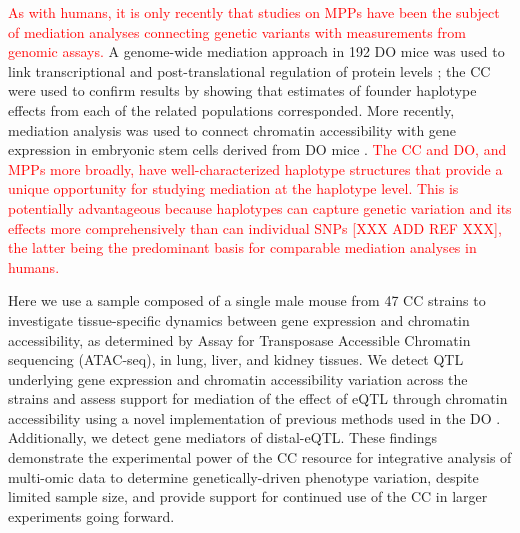 \documentclass[10pt,letterpaper]{article}
\newcommand{\WVinline}[1]{\textcolor{red}{#1}}
\newcommand{\GK}[2]{\textcolor{teal}{#1\footnote{\textcolor{teal}{GK: #2}}}}
\newcommand{\GKinline}[1]{\textcolor{teal}{#1}}
\newcommand{\TF}[2]{\textcolor{purple}{#1\footnote{\textcolor{purple}{TF: #2}}}}
\begin{document}
\WVinline{As with humans, it is only recently that studies on MPPs have been the subject of mediation analyses connecting genetic variants with measurements from genomic assays.}
A genome-wide mediation approach in 192 DO mice was used to link transcriptional and post-translational regulation of protein levels \cite{Chick2016}; the CC were used to confirm results by showing that estimates of founder haplotype effects from each of the related populations corresponded. More recently, mediation analysis was used to connect chromatin accessibility with gene expression in embryonic stem cells derived from DO mice \cite{Skelly2019}. 
\WVinline{The CC and DO, and MPPs more broadly, have well-characterized haplotype structures that provide a unique opportunity for studying mediation at the haplotype level. This is potentially advantageous because haplotypes can capture genetic variation and its effects more comprehensively than can individual SNPs \cite{Zhang2014}[XXX ADD REF XXX], the latter being the predominant basis for comparable mediation analyses in humans.}

Here we use a sample composed of a single male mouse from 47 CC strains to investigate tissue-specific dynamics between gene expression and chromatin accessibility, as determined by Assay for Transposase Accessible Chromatin sequencing (ATAC-seq), in lung, liver, and kidney tissues. We detect QTL underlying gene expression and chromatin accessibility variation across the strains and assess support for mediation of the effect of eQTL through chromatin accessibility using a novel implementation of previous methods used in the DO \cite{Chick2016}. Additionally, we detect gene mediators of distal-eQTL. 
These findings demonstrate the experimental power of the CC resource for integrative analysis of multi-omic data to determine genetically-driven phenotype variation, despite limited sample size, and provide support for continued use of the CC in larger experiments going forward.
\end{document}
